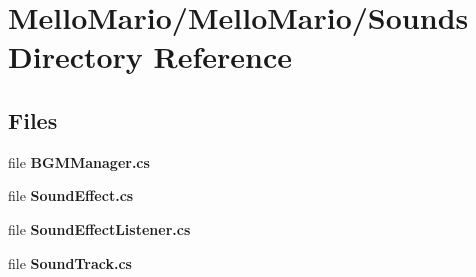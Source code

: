 \section{Mello\+Mario/\+Mello\+Mario/\+Sounds Directory Reference}
\label{dir_fc33f375929b24c3afb98ac49de08299}
\subsection*{Files}
\begin{DoxyCompactItemize}
\item 
file \textbf{ B\+G\+M\+Manager.\+cs}
\item 
file \textbf{ Sound\+Effect.\+cs}
\item 
file \textbf{ Sound\+Effect\+Listener.\+cs}
\item 
file \textbf{ Sound\+Track.\+cs}
\end{DoxyCompactItemize}
